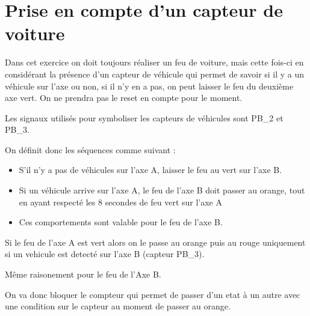 \documentclass[11pt]{report}
\begin{document}
\section{Prise en compte d'un capteur de voiture}


Dans cet exercice on doit toujours réaliser un feu de voiture, mais cette fois-ci en considérant la présence d'un capteur de véhicule qui permet de savoir si il y a un véhicule sur l'axe ou non, si il n'y en a pas, on peut laisser le feu du deuxième axe vert. On ne prendra pas le reset en compte pour le moment.

Les signaux utilisés pour symboliser les capteurs de véhicules sont PB\_2 et PB\_3.

On définit donc les séquences comme suivant :
\begin{itemize}
	\item S'il n'y a pas de véhicules sur l'axe A, laisser le feu au vert sur l'axe B.
	\item Si un véhicule arrive sur l'axe A, le feu de l'axe B doit passer au orange, tout en ayant respecté les 8 secondes de feu vert sur l'axe A
	\item Ces comportements sont valable pour le feu de l'axe B.

\end{itemize}

Si le feu de l'axe A est vert alors on le passe au orange puis au rouge uniquement
si un vehicule est detecté sur l'axe B (capteur PB\_3).

Même raisonement pour le feu de l'Axe B.

On va donc bloquer le compteur qui permet de passer d'un etat à un autre avec
une condition sur le capteur au moment de passer au orange.
\end{document}
